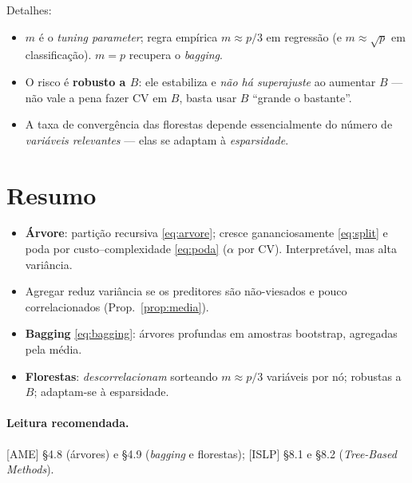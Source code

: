 \documentclass[11pt,a4paper]{article}
\begin{document}
\noindent Detalhes:
\begin{itemize}[leftmargin=1.4cm,nosep]
  \item $m$ é o \emph{tuning parameter}; regra empírica $m\approx p/3$ em regressão
        (e $m\approx\sqrt p$ em classificação). $m=p$ recupera o \emph{bagging}.
  \item O risco é \textbf{robusto a $B$}: ele estabiliza e \emph{não há
        superajuste} ao aumentar $B$ --- não vale a pena fazer CV em $B$, basta
        usar $B$ ``grande o bastante''.
  \item A taxa de convergência das florestas depende
        essencialmente do número de \emph{variáveis relevantes} --- elas se adaptam
        à \emph{esparsidade}.
\end{itemize}

\section*{Resumo}
\begin{itemize}[leftmargin=1.4cm]
  \item \textbf{Árvore}: partição recursiva \eqref{eq:arvore}; cresce
        gananciosamente \eqref{eq:split} e poda por custo--complexidade
        \eqref{eq:poda} ($\alpha$ por CV). Interpretável, mas alta variância.
  \item Agregar reduz variância se os preditores são não-viesados e pouco
        correlacionados (Prop.~\ref{prop:media}).
  \item \textbf{Bagging} \eqref{eq:bagging}: árvores profundas em amostras
        bootstrap, agregadas pela média.
  \item \textbf{Florestas}: \emph{descorrelacionam} sorteando $m\approx p/3$
        variáveis por nó; robustas a $B$; adaptam-se à esparsidade.
\end{itemize}

\paragraph{Leitura recomendada.} [AME] §4.8 (árvores) e §4.9 (\emph{bagging} e
florestas); [ISLP] §8.1 e §8.2 (\emph{Tree-Based Methods}).
\end{document}
